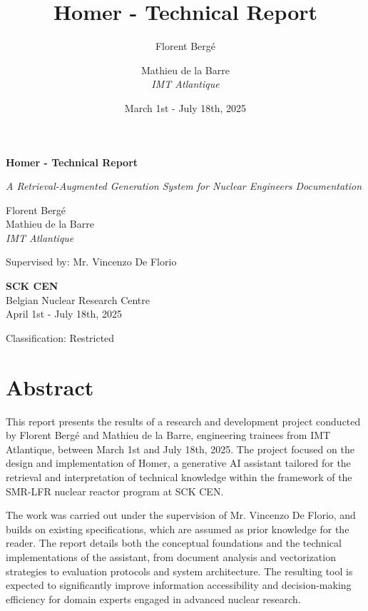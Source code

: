 \documentclass[11pt,a4paper]{report}
\title{\textbf{Homer - Technical Report}}
\author{
    Florent Bergé \\
    \and
    Mathieu de la Barre \\
    \textit{IMT Atlantique}
}
\date{March 1st - July 18th, 2025}
\begin{document}
\begin{titlepage}
    \centering
    \vspace*{2cm}
    
    {\huge\bfseries Homer - Technical Report\par}
    \vspace{1cm}
    {\Large\itshape A Retrieval-Augmented Generation System for Nuclear Engineers Documentation\par}
    \vspace{2cm}
    
    {\Large
    Florent Bergé \\
    Mathieu de la Barre \\
    \textit{IMT Atlantique}
    \par}
    \vspace{1cm}
    
    {\large Supervised by: Mr. Vincenzo De Florio\par}
    \vspace{2cm}
    
    {\large
    \textbf{SCK CEN} \\
    Belgian Nuclear Research Centre \\
    April 1st - July 18th, 2025
    \par}
    
    \vfill
    
    {\large
    Classification: Restricted
    \par}
    
\end{titlepage}

\tableofcontents
\newpage

\section{Abstract}

This report presents the results of a research and development project conducted by Florent Bergé and Mathieu de la Barre, engineering trainees from IMT Atlantique, between March 1st and July 18th, 2025. The project focused on the design and implementation of Homer, a generative AI assistant tailored for the retrieval and interpretation of technical knowledge within the framework of the SMR-LFR nuclear reactor program at SCK CEN.

The work was carried out under the supervision of Mr. Vincenzo De Florio, and builds on existing specifications, which are assumed as prior knowledge for the reader. The report details both the conceptual foundations and the technical implementations of the assistant, from document analysis and vectorization strategies to evaluation protocols and system architecture. The resulting tool is expected to significantly improve information accessibility and decision-making efficiency for domain experts engaged in advanced nuclear research.
\end{document}
